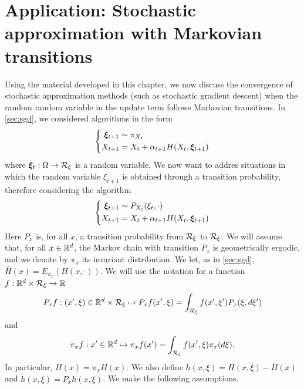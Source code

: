 \section[Markovian Stochastic Approximation]{Application: Stochastic approximation with Markovian transitions}

Using the material developed in this chapter, we now discuss the convergence of stochastic approximation methods (such as stochastic gradient descent) when the random random variable in the update term follows Markovian transitions. In \cref{sec:sgd}, we considered algorithms in the form
\[
\left\{
\begin{aligned}
\bm\xi_{t+1} &\sim \pi_{X_t}\\
X_{t+1} &= X_t + \alpha_{t+1} H(X_t, \bm\xi_{t+1})
\end{aligned}
\right.
\]
where ${\bm{\xi}}_t: \Omega \to {\mathcal R}_\xi$ is a random variable. We now want to addres situations in which the random variable $\xi_{t+1}$ is obtained through a transition probability, therefore considering the algorithm
\begin{equation}
\label{eq:sa.markov}
\left\{
\begin{aligned}
\bm\xi_{t+1} &\sim P_{X_t}(\xi_t, \cdot)\\
X_{t+1} &= X_t + \alpha_{t+1} H(X_t, \bm\xi_{t+1})
\end{aligned}
\right.
\end{equation}
Here  $P_x$ is, for all $x$, a transition probability from ${\mathcal R}_\xi$ to ${\mathcal R}_\xi$. We will assume that, for all $x\in {\mathbb{R}}^d$, the Markov chain with transition $P_x$ is geometrically ergodic, and we denote by $\pi_x$ its invariant distribution. We let, as in \cref{sec:sgd}, $\bar H(x) = E_{\pi_x}(H(x, \cdot))$. We will use the notation for a function $f: {\mathbb{R}}^d \times {\mathcal R}_\xi \to {\mathbb{R}}$
\[
P_xf: (x', \xi)\in {\mathbb{R}}^d \times {\mathcal R}_\xi  \mapsto P_xf(x', \xi)= \int_{{\mathcal R}_\xi} f(x', \xi') P_x(\xi, d\xi')
\]
and
\[
\pi_x f: x'\in {\mathbb{R}}^d \mapsto \pi_x f(x') = \int_{{\mathcal R}_\xi} f(x', \xi) \pi_x(d\xi).
\]
In particular, $\bar H(x) = \pi_x H(x)$. We also define $h(x, \xi) = H(x, \xi) - \bar H(x)$ and $\tilde h(x, \xi) = P_x h(x, \xi)$. 
We make the following assumptions.
